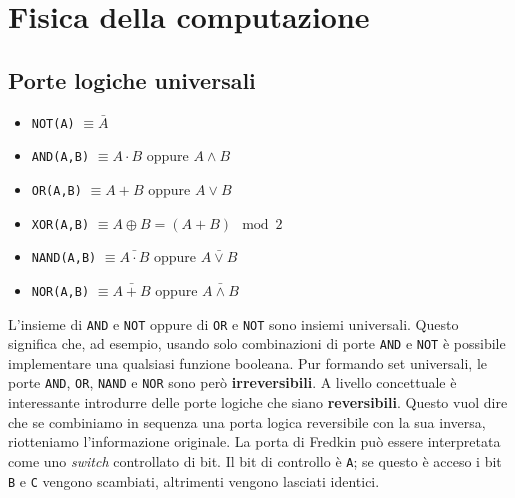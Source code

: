 \documentclass[12pt, a4paper]{report}
\begin{document}
\newpage
\tableofcontents
\chapter{Fisica della computazione}
\section{Porte logiche universali}
\begin{itemize}
    \item \texttt{NOT(A)} $\equiv \bar{A}$
    \item \texttt{AND(A,B)} $\equiv A \cdot B$ oppure $A \land B$
    \item \texttt{OR(A,B)} $\equiv A + B$ oppure $A \lor B$
    \item \texttt{XOR(A,B)} $\equiv A \oplus B = (A+B) \mod 2$
    \item \texttt{NAND(A,B)} $\equiv \bar{A \cdot B}$ oppure $\bar{A \lor B}$
    \item \texttt{NOR(A,B)} $\equiv \bar{A + B}$ oppure $\bar{A \land B}$
\end{itemize}
L'insieme di \texttt{AND} e \texttt{NOT} oppure di \texttt{OR} e \texttt{NOT} sono insiemi universali. Questo significa che, ad esempio, usando solo combinazioni di porte \texttt{AND} e \texttt{NOT} è possibile implementare una qualsiasi funzione booleana. Pur formando set universali, le porte \texttt{AND}, \texttt{OR}, \texttt{NAND} e \texttt{NOR} sono però \textbf{irreversibili}. A livello concettuale è interessante introdurre delle porte logiche che siano \textbf{reversibili}. Questo vuol dire che se combiniamo in sequenza una porta logica reversibile con la sua inversa, riotteniamo l'informazione originale. La porta di Fredkin può essere interpretata come uno \textit{switch} controllato di bit. Il bit di controllo è \texttt{A}; se questo è acceso i bit \texttt{B} e \texttt{C} vengono scambiati, altrimenti vengono lasciati identici.
\end{document}
